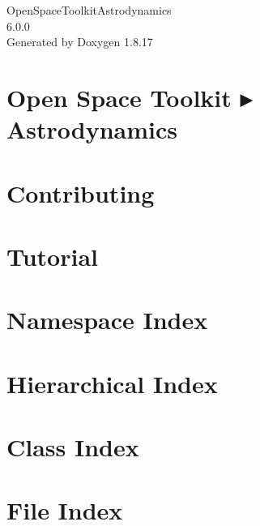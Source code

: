 \let\mypdfximage\pdfximage\def\pdfximage{\immediate\mypdfximage}\documentclass[twoside]{book}
\newcommand{\+}{\discretionary{\mbox{\scriptsize$\hookleftarrow$}}{}{}}
\newcommand{\clearemptydoublepage}{%
  \newpage{\pagestyle{empty}\cleardoublepage}%
}
\begin{document}
\hypersetup{pageanchor=false,
             bookmarksnumbered=true,
             pdfencoding=unicode
            }
\begin{titlepage}
\vspace*{7cm}
\begin{center}%
{\Large Open\+Space\+Toolkit\+Astrodynamics \\[1ex]\large 6.\+0.\+0 }\\
\vspace*{1cm}
{\large Generated by Doxygen 1.8.17}\\
\end{center}
\end{titlepage}
\clearemptydoublepage
{}
\tableofcontents
\clearemptydoublepage
{}
\hypersetup{pageanchor=true}

\chapter{Open Space Toolkit ▸ Astrodynamics}
\label{index}\hypertarget{index}{}
\chapter{Contributing}
\label{md__c_o_n_t_r_i_b_u_t_i_n_g}

\chapter{Tutorial}
\label{md_docs__tutorial}

\chapter{Namespace Index}

\chapter{Hierarchical Index}

\chapter{Class Index}

\chapter{File Index}

\end{document}
